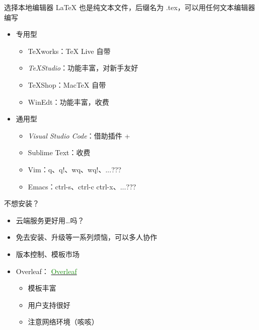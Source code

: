 \begin{frame}{选择本地编辑器}
  LaTeX 也是纯文本文件，后缀名为 .tex，可以用任何文本编辑器编写

    \begin{itemize}
      \item<+-> 专用型
    
        \begin{itemize}
          \item TeXworks：\TeX{} Live 自带 \faWindows{} \faApple{} \faLinux{}
          \item \emph{TeXStudio}：功能丰富，对新手友好 \faWindows{} \faApple{} \faLinux{}
          \item TeXShop：Mac\TeX{} 自带 \faApple{}
          \item WinEdt：功能丰富，收费 \faWindows{}
        \end{itemize}
    
      \item<+-> 通用型
    
        \begin{itemize}
          \item \emph{Visual Studio Code}：借助插件  + 
          \item Sublime Text：收费
          \item Vim：q、q!、wq、wq!、...???
          \item Emacs：ctrl-s、ctrl-c ctrl-x、...???
        \end{itemize}

    \end{itemize}
\end{frame}

\begin{frame}{不想安装？}
  \begin{itemize}
  \item 云端服务更好用…吗？
  \item 免去安装、升级等一系列烦恼，可以多人协作
  \item 版本控制、模板市场
  \end{itemize} \pause

  \begin{itemize} \small
  \item Overleaf：
      \href{https://cn.overleaf.com}{\textcolor[HTML]{138a07}{Overleaf} \faLink}

      \begin{itemize}
      \item 模板丰富
      \item 用户支持很好
      \pause
      \item 注意网络环境（咳咳）
      \end{itemize}
  \end{itemize}

\end{frame}

